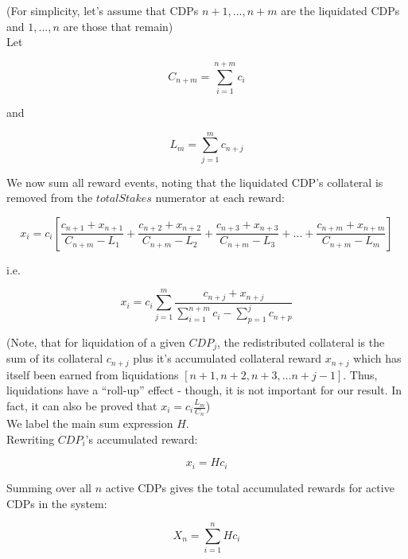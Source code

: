 \documentclass[reqno]{article}
\begin{document}
(For simplicity, let’s assume that CDPs $n+1, ..., n+m$ are the liquidated CDPs and $1, ..., n$ are those that remain)\\

Let

\begin{equation} 
    C_{n+m}=\sum\limits^{n+m}_{i=1}c_i
\end{equation}

\bigskip
and

\begin{equation} 
    L_m=\sum\limits^m_{j=1}c_{n+j}
\end{equation}

\bigskip
We now sum all reward events, noting that the liquidated CDP’s collateral is removed from the $totalStakes$ numerator at each reward:

\begin{equation} 
    x_i=c_i\left[\frac{c_{n+1}+x_{n+1}}{C_{n+m}-L_1}+\frac{c_{n+2}+x_{n+2}}{C_{n+m}-L_2}+\frac{c_{n+3}+x_{n+3}}{C_{n+m}-L_3}+...+\frac{c_{n+m}+x_{n+m}}{C_{n+m}-L_m}\right]
\end{equation}

\bigskip
i.e.

\begin{equation} 
    x_i=c_i\sum\limits^m_{j=1}\frac{c_{n+j}+x_{n+j}}{\sum\limits^{n+m}_{i=1}c_i-\sum\limits^j_{p=1}c_{n+p}}
\end{equation}

\bigskip
(Note, that for liquidation of a given $CDP_j$, the redistributed collateral is the sum of its collateral $c_{n+j}$ plus it’s accumulated collateral reward $x_{n+j}$ which has itself been earned from liquidations $[n+1, n+2, n+3, … n+j-1]$.  Thus, liquidations have a “roll-up” effect - though, it is not important for our result. In fact, it can also be proved that $x_i=c_i\frac{L_m}{C_n}$)\\

We label the main sum expression $H$.\\

Rewriting $CDP_i$’s accumulated reward:

\begin{equation} \label{eq:45}
    x_i=Hc_i
\end{equation}

\bigskip
Summing over all $n$ active CDPs gives the total accumulated rewards for active CDPs in the system:

\begin{equation} 
    X_n=\sum\limits^n_{i=1}Hc_i
\end{equation}
\end{document}
